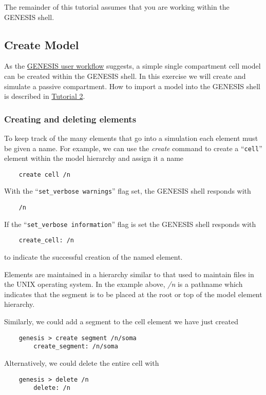 \documentclass[12pt]{article}
\begin{document}
The remainder of this tutorial assumes that you are working within the GENESIS shell.

\subsection*{Create Model}

As the \href{../workflow-user/workflow-user.tex}{GENESIS user workflow} suggests, a simple single compartment cell model can be created within the GENESIS shell. In this exercise we will create and simulate a passive compartment. How to import a model into the GENESIS shell is described in \href{../tutorial2/tutorial2.tex}{Tutorial 2}.

\subsubsection*{Creating and deleting elements}

To keep track of the many elements that go into a simulation each element must be given a name. For example, we can use the {\it create} command to create a ``{\tt cell}'' element within the model hierarchy and assign it a name  
\begin{verbatim}
    create cell /n
\end{verbatim}
With the  ``{\tt set\_verbose warnings}'' flag set, the GENESIS shell responds with
\begin{verbatim}
    /n
\end{verbatim}
If the ``{\tt set\_verbose information}'' flag is set the GENESIS shell responds with
\begin{verbatim}
    create_cell: /n
\end{verbatim}
to indicate the successful creation of the named element.

Elements are maintained in a hierarchy similar to that used to maintain files in the UNIX operating system. In the example above, {\it /n} is a pathname which indicates that the segment is to be placed at the root or top of the model element hierarchy.

Similarly, we could add a segment to the cell element we have just created
\begin{verbatim}
    genesis > create segment /n/soma
        create_segment: /n/soma
\end{verbatim}
Alternatively, we could delete the entire cell with 
\begin{verbatim}
    genesis > delete /n
        delete: /n
\end{verbatim}
\end{document}

